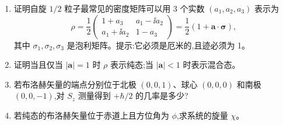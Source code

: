 \begin{question}
\begin{enumerate}
\item 证明自旋 $1/2$ 粒子最常见的密度矩阵可以用 3 个实数 $(a_1,a_2,a_3)$ 表示为
\[
\rho=\frac12\begin{pmatrix}1+a_3&a_1-\ii a_2\\a_1+\ii a_2&1-a_3\end{pmatrix}=\frac12(1+\mathbf a\cdot\boldsymbol\sigma),
\]
其中 $\sigma_1,\sigma_2,\sigma_3$ 是泡利矩阵。提示:它必须是厄米的,且迹必须为 1。
\item 证明当且仅当 $|\mathbf a|=1$ 时 $\rho$ 表示纯态;当 $|\mathbf a|<1$ 时表示混合态。
\item 若布洛赫矢量的端点分别位于北极 $(0,0,1)$、球心 $(0,0,0)$ 和南极 $(0,0,-1)$,对 $S_z$ 测量得到 $+\hbar/2$ 的几率是多少?
\item 若纯态的布洛赫矢量位于赤道上且方位角为 $\phi$,求系统的旋量 $\chi$。
\end{enumerate}
\end{question}
